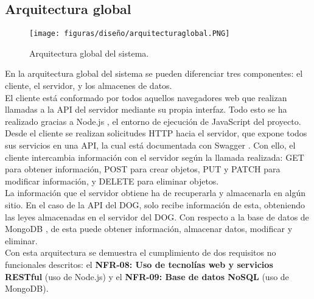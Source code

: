 \subsection{Arquitectura global}

\begin{figure}[H]
\centerline{\texttt{[image: figuras/diseño/arquitecturaglobal.PNG]}}
\caption{Arquitectura global del sistema.}
\label{enlaceArquitecturaGlobal}
\end{figure}

En la arquitectura global del sistema se pueden diferenciar tres componentes: el cliente, el servidor, y los almacenes de datos.
\\

El cliente está conformado por todos aquellos navegadores web que realizan llamadas a la API del servidor mediante su propia interfaz. Todo esto se ha realizado gracias a Node.js \cite{nodejs}, el entorno de ejecución de JavaScript del proyecto.
\\

Desde el cliente se realizan solicitudes HTTP hacia el servidor, que expone todos sus servicios en una API, la cual está documentada con Swagger \cite{swagger}. Con ello, el cliente intercambia información con el servidor según la llamada realizada: GET para obtener información, POST para crear objetos, PUT y PATCH para modificar información, y DELETE para eliminar objetos.
\\

La información que el servidor obtiene ha de recuperarla y almacenarla en algún sitio. En el caso de la API del DOG, solo recibe información de esta, obteniendo las leyes almacenadas en el servidor del DOG. Con respecto a la base de datos de MongoDB \cite{mongodb}, de esta puede obtener información, almacenar datos, modificar y eliminar.
\\

Con esta arquitectura se demuestra el cumplimiento de dos requisitos no funcionales descritos: el {\bf NFR-08: Uso de tecnolías web y servicios RESTful} (uso de Node.js) y el {\bf NFR-09: Base de datos NoSQL} (uso de MongoDB).